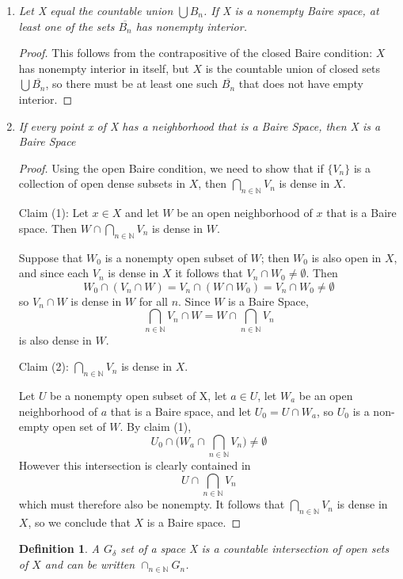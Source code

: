 \documentclass[12pt]{article}
\newtheorem{definition}{Definition}
\newcommand{\bdf}{\begin{definition}}
\newcommand{\edf}{\end{definition}}
\newcommand{\mbN}{\mathbb{N}}
\begin{document}
\begin{enumerate}[1.]
	\item \textit{ Let X equal the countable union $\bigcup B_n$. If X is a nonempty Baire space, at least one of the sets $\overline{B_n}$ has nonempty interior. }
	\begin{proof}
		This follows from the contrapositive of the closed Baire condition: $X$ has nonempty interior in itself, but $X$ is the countable union of closed sets $\bigcup \overline{B_n}$, so there must be at least one such $\overline{B_n}$ that does not have empty interior. 
	\end{proof}
	\item \textit{ If every point x of X has a neighborhood that is a Baire Space, then X is a Baire Space}
	\begin{proof}
		Using the open Baire condition, we need to show that if $\{V_n\}$ is a collection of open dense subsets in $X$, then $\bigcap_{n\in \mbN}V_n$ is dense in $X$. \par
		Claim (1): Let $x\in X$ and let $W$ be an open neighborhood of $x$ that is a Baire space. Then $W\cap \bigcap_{n\in \mbN}V_n$ is dense in $W$. \par  Suppose that $W_0$ is a nonempty open subset of $W$; then $W_0$ is also open in $X$, and since each $V_n$ is dense in $X$ it follows that $V_n \cap W_0 \neq \emptyset$. Then 
		\[W_0\cap (V_n\cap W)= V_n\cap (W\cap W_0)= V_n \cap W_0 \neq \emptyset
		\]
	so $V_n\cap W$ is dense in $W$ for all $n$. Since $W$ is a Baire Space, \[\bigcap_{n\in \mbN}V_n\cap W = W\cap \bigcap_{n\in \mbN}V_n\] is also dense in $W$. \par 
	Claim (2): $\bigcap_{n\in \mbN}V_n $ is dense in $X$. \par  Let $U$ be a nonempty open subset of X, let $a\in U$, let $W_a$ be an open neighborhood of $a$ that is a Baire space, and let $U_0=U\cap W_a$, so $U_0$ is a non-empty open set of $W$. By claim (1), 
		\[ U_0 \cap \bigg( W_a\cap \bigcap_{n\in \mbN}V_n \bigg) \neq \emptyset
	\]
	However this intersection is clearly contained in 
	\[U\cap \bigcap_{n\in \mbN}V_n
	\]
	which must therefore also be nonempty. It follows that $\bigcap_{n\in \mbN}V_n$ is dense in $X$, so we conclude that $X$ is a Baire space. 
	\end{proof}
	\bdf A $G_{\delta}$ set of a space X is a countable intersection of open sets of $X$ and can be written $\cap_{n\in \mbN}G_n$.
	\edf
	

\end{enumerate}
\end{document}
